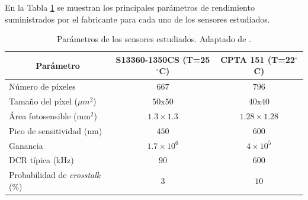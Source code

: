 En la Tabla \ref{table_SiPMs} se muestran los principales parámetros de rendimiento suministrados por el fabricante para cada uno de los sensores estudiados. %
\begin{table}[h!]
\caption{Parámetros de los sensores estudiados. Adaptado de \citep{Sipm_S13360_1350CS_datasheet, CPTA_data}.}
    \label{table_SiPMs}
	\begin{tabular}{ c  c  c}
    \hline
    Parámetro                                                   & S13360-1350CS (T=25$^\circ$C)     & CPTA 151 (T=22$^\circ$C)  \\ \hline
    \multicolumn{1}{l}{Número de píxeles}                       & $667$              & $796$       \\
    \multicolumn{1}{l}{Tamaño del píxel ($\mu m^2$)}               & $50\mbox{x}50$               & $40\mbox{x}40$       \\
    \multicolumn{1}{l}{\´Área fotosensible ($\mbox{mm}^2$)}     & $1.3\times1.3$     & $1.28\times1.28$\\
    \multicolumn{1}{l}{Pico de sensitividad (nm)}               & $450$              & $600$       \\
    \multicolumn{1}{l}{Ganancia}                                & $1.7\times10^6$    & $4\times10^5$       \\
    \multicolumn{1}{l}{DCR típica (kHz)}      & $90$               & $600$       \\
    \multicolumn{1}{l}{Probabilidad de \textit{crosstalk} (\%)} & $3$                & $10$       \\ \hline
	\end{tabular}
\end{table}
